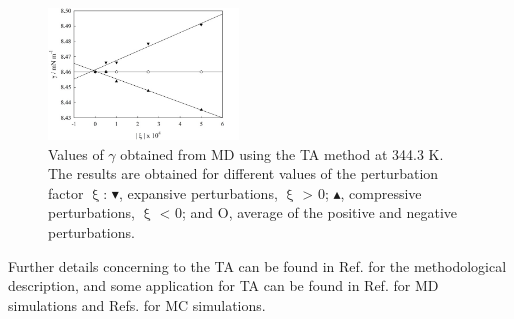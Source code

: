 \documentclass[9pt,tutorial]{livecoms}
\begin{document}
\begin{figure}
\includegraphics[width=0.45\textwidth]{gfx/image66.jpeg}
\caption{Values of {${\gamma}$} obtained from MD using the TA method at 344.3 K. The results are obtained for different values of the perturbation factor ${\upxi}$: $\blacktriangledown$, expansive perturbations, ${\upxi}$ {\textgreater} 0; $\blacktriangle$, compressive perturbations, ${\upxi}$ {\textless} 0; and O, average of the positive and negative perturbations.}
\label{fig:20}
\end{figure}

Further details concerning to the TA can be found in Ref.
\citep{gloor2005} for the methodological description, and some
application for TA can be found in Ref. \citep{muller2009}
for MD simulations and Refs. \citep{ghoufi2016,sampayo2010} for MC simulations.
\end{document}
